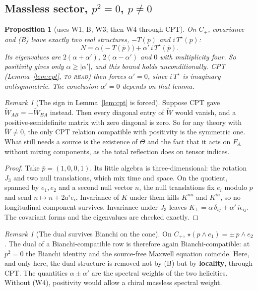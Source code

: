 \documentclass[11pt]{article}
\newtheorem{proposition}[theorem]{Proposition}
\theoremstyle{remark}
\newtheorem{remark}[theorem]{Remark}
\newcommand{\Wt}{\widetilde W}
\newcommand{\Tt}{T}
\newcommand{\dual}{{\star}}
\begin{document}
\subsection{Massless sector, $p^2=0$, $p\neq0$}

\begin{proposition}[uses W1, B, W3; then W4 through CPT]\label{prop:null}
On $C_+$, covariance and (B) leave exactly two real structures,
$-\Tt(p)$ and $i\,\Tt^{\dual}(p)$:
\begin{equation}
N=\alpha\,\bigl(-\Tt(\bar p)\bigr)+\alpha'\,i\,\Tt^{\dual}(\bar p).
\end{equation}
Its eigenvalues are $2(\alpha+\alpha')$, $2(\alpha-\alpha')$ and $0$ with
multiplicity four. So positivity gives only $\alpha\ge|\alpha'|$, and this
bound holds \emph{unconditionally}. CPT (Lemma~\ref{lem:cpt}, \textsc{to read})
then forces $\alpha'=0$, since $i\,\Tt^{\dual}$ is imaginary antisymmetric.
The conclusion $\alpha'=0$ depends on that lemma.
\end{proposition}

\begin{remark}[The sign in Lemma~\ref{lem:cpt} is forced]
Suppose CPT gave $\Wt_{AB}=-\Wt_{BA}$ instead. Then every diagonal entry of
$\Wt$ would vanish, and a positive-semidefinite matrix with zero diagonal is
zero. So for any theory with $\Wt\neq0$, the only CPT relation compatible with
positivity is the symmetric one. What still needs a source is the existence of
$\Theta$ and the fact that it acts on $F_A$ without mixing components, as the
total reflection does on tensor indices.
\end{remark}
\begin{proof}
Take $\bar p=(1,0,0,1)$. Its little algebra is three-dimensional: the rotation
$J_3$ and two null translations, which mix time and space. On the quotient,
spanned by $e_1,e_2$ and a second null vector $n$, the null translations fix
$e_i$ modulo $p$ and send $n\mapsto n+2a^ie_i$. Invariance of $K$ under them
kills $K^{nn}$ and $K^{in}$, so no longitudinal component survives. Invariance
under $J_3$ leaves $K_\perp=\alpha\,\delta_{ij}+\alpha'\,i\epsilon_{ij}$. The
covariant forms and the eigenvalues are checked exactly.
\end{proof}

\begin{remark}[The dual survives Bianchi on the cone]
On $C_+$, $\dual(p\wedge e_1)=\pm\,p\wedge e_2$. The dual of a
Bianchi-compatible row is therefore again Bianchi-compatible: at $p^2=0$ the
Bianchi identity and the source-free Maxwell equation coincide. Here, and only
here, the dual structure is removed not by (B) but by \textbf{locality}, through
CPT. The quantities $\alpha\pm\alpha'$ are the spectral weights of the two
helicities. Without (W4), positivity would allow a chiral massless spectral
weight.
\end{remark}
\end{document}
